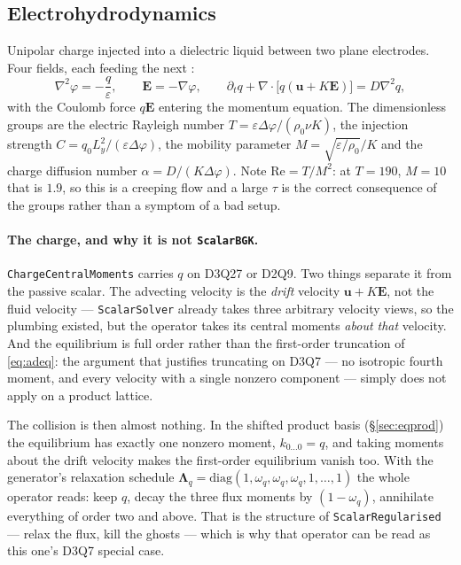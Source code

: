 \documentclass[11pt,a4paper]{article}
\newcommand{\code}[1]{\texttt{\small #1}}
\newcommand{\uu}{\bm{u}}
\begin{document}
\subsection{Electrohydrodynamics}
\label{sec:ehd}

Unipolar charge injected into a dielectric liquid between two plane electrodes.
Four fields, each feeding the next \cite{patnaik2025}:
\begin{equation}
  \nabla^2\varphi = -\frac{q}{\varepsilon},\qquad
  \bm{E} = -\nabla\varphi,\qquad
  \partial_t q + \nabla\!\cdot\!\big[q(\uu + K\bm{E})\big] = D\nabla^2 q,
  \label{eq:ehd}
\end{equation}
with the Coulomb force $q\bm{E}$ entering the momentum equation. The
dimensionless groups are the electric Rayleigh number
$T = \varepsilon\Delta\varphi/(\rho_0\nu K)$, the injection strength
$C = q_0 L_y^2/(\varepsilon\Delta\varphi)$, the mobility parameter
$M = \sqrt{\varepsilon/\rho_0}/K$ and the charge diffusion number
$\alpha = D/(K\Delta\varphi)$. Note $\mathrm{Re} = T/M^2$: at $T=190$, $M=10$
that is $1.9$, so this is a creeping flow and a large $\tau$ is the correct
consequence of the groups rather than a symptom of a bad setup.

\paragraph{The charge, and why it is not \code{ScalarBGK}.}
\code{ChargeCentralMoments} carries $q$ on D3Q27 or D2Q9. Two things separate it
from the passive scalar. The advecting velocity is the \emph{drift} velocity
$\uu + K\bm{E}$, not the fluid velocity --- \code{ScalarSolver} already takes
three arbitrary velocity views, so the plumbing existed, but the operator takes
its central moments \emph{about that} velocity. And the equilibrium is full
order rather than the first-order truncation of \eqref{eq:adeq}: the argument
that justifies truncating on D3Q7 --- no isotropic fourth moment, and every
velocity with a single nonzero component --- simply does not apply on a product
lattice.

The collision is then almost nothing. In the shifted product basis
(\S\ref{sec:eqprod}) the equilibrium has exactly one nonzero moment,
$k_{0\ldots0}=q$, and taking moments about the drift velocity makes the
first-order equilibrium vanish too. With the generator's relaxation schedule
$\bm{\Lambda}_q=\mathrm{diag}(1,\omega_q,\omega_q,\omega_q,1,\ldots,1)$ the whole
operator reads: keep $q$, decay the three flux moments by $(1-\omega_q)$,
annihilate everything of order two and above. That is the structure of
\code{ScalarRegularised} --- relax the flux, kill the ghosts --- which is why
that operator can be read as this one's D3Q7 special case.
\end{document}
